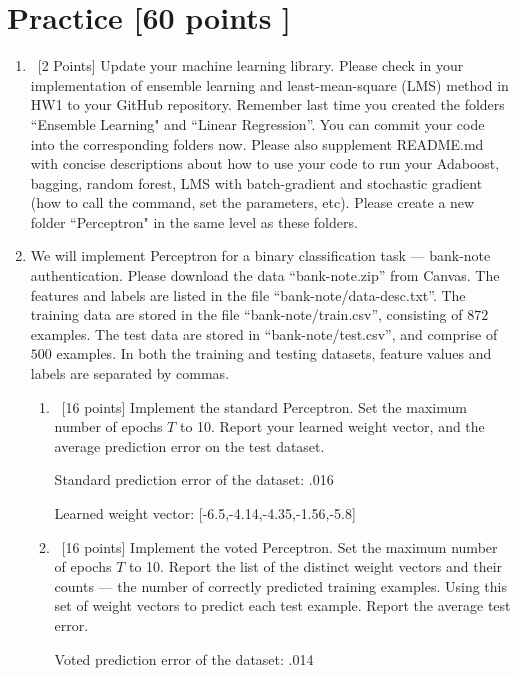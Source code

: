 \documentclass[12pt, fullpage,letterpaper]{article}
\begin{document}
\section{Practice [60 points ]}
\begin{enumerate}
	\item~[2 Points] Update your machine learning library. Please check in your implementation of ensemble learning and least-mean-square (LMS) method in HW1 to your GitHub repository. Remember last time you created the folders ``Ensemble Learning" and ``Linear Regression''. You can commit your code into the corresponding folders now. Please also supplement README.md with concise descriptions about how to use your code to run your Adaboost, bagging, random forest, LMS with batch-gradient and stochastic gradient (how to call the command, set the parameters, etc). Please create a new folder ``Perceptron" in the same level as these folders.  

\item We will implement  Perceptron for a binary classification task --- bank-note authentication. Please download the data ``bank-note.zip'' from Canvas. The features and labels are listed in the file ``bank-note/data-desc.txt''. The training data are stored in the file ``bank-note/train.csv'', consisting of $872$ examples. The test data are stored in ``bank-note/test.csv'', and comprise of $500$ examples. In both the training and testing datasets, feature values and labels are separated by commas. 
\begin{enumerate}
	\item~[16 points] Implement the standard Perceptron. Set the maximum number of epochs $T$ to 10. Report your learned weight vector, and the average prediction error on the test dataset.  \newline

Standard prediction error of the dataset: .016


Learned weight vector: [-6.5,-4.14,-4.35,-1.56,-5.8]



	\item~[16 points] Implement the voted Perceptron. Set the maximum number of epochs $T$ to 10. Report the list of the distinct weight vectors and their counts --- the number of correctly predicted training examples. Using this set of weight vectors to predict each test example. Report the average test error.   \newline

Voted prediction error of the dataset: .014


\end{enumerate}
\end{enumerate}
\end{document}
